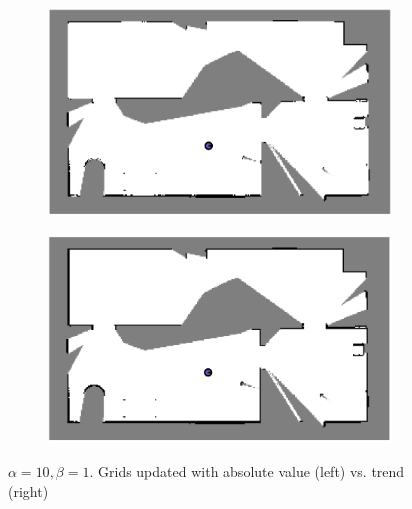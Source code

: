 \documentclass{article} %
\begin{document}
\begin{figure}[hbt]
  \centering
  \begin{subfigure}[b]{0.49\textwidth}
    \centering
    \includegraphics[width=\textwidth]{ass2_q1_a10b1.png}
  \end{subfigure}
  \hfill
  \begin{subfigure}[b]{0.49\textwidth}
    \centering
    \includegraphics[width=\textwidth]{ass2_q1_a10b1_post_best.png}
  \end{subfigure}
\caption{$\alpha = 10, \beta = 1$. Grids updated with absolute value (left) vs. trend (right)}
\label{fig:q1_a10}
\end{figure}
\end{document}
